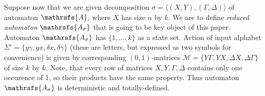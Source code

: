 \documentclass[11pt]{llncs}
\newcommand{\A}{\mathrsfs{A}}
\newcommand{\AD}{\mathrsfs{A_{\sigma}}}
\newcommand{\G}{\Gamma}
\newcommand{\D}{\Delta}
\newcommand{\g}{\gamma}
\newcommand{\dl}{\delta}
\newcommand{\rk}{rk}
\begin{document}
Suppose now that we are given decomposition $\sigma = \langle(X,Y), (\G,\D)\rangle$ of 
automaton $\A$, where $X$ has size $n$ by $k$.
We are to define \emph{reduced automaton} $\AD$ that is going to be key object of this paper.
Automaton $\AD$ has $\{1,\ldots, k\}$ as a state
set. Action of input alphabet $\Sigma' = \{ y\g, yx, \dl x, \dl\g \}$ (these are letters, 
but expressed as two symbols for convenience) is given
by corresponding $(0,1)$-matrices $\mathcal{M} =\{ Y\G , YX, \D X, \D\G \}$ of size $k$ by $k$.
Note, that every row of matrices $X, Y, \G, \D$ contains only one occurence of 1, 
so their products have the same property. Thus automaton $\AD$
is deterministic and totally-defined.

\end{document}
